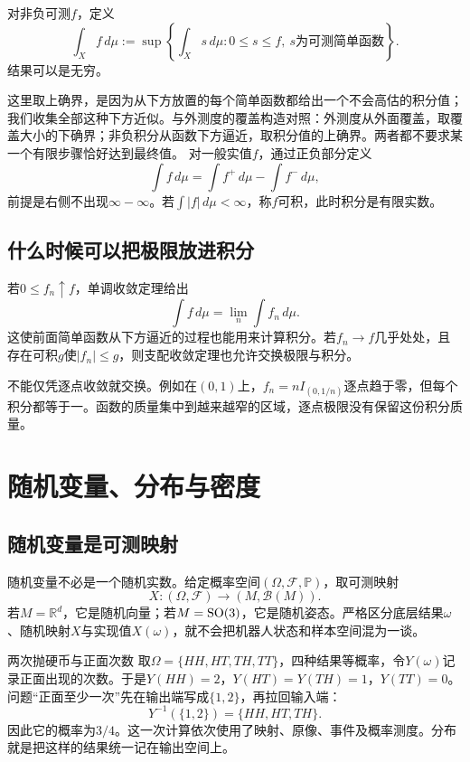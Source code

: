 对非负可测$f$，定义
\[
 \int_X f\,d\mu
 :=\sup\left\{\int_X s\,d\mu:
      0\leq s\leq f,\ s\text{为可测简单函数}\right\}.
\]
结果可以是无穷。

这里取上确界，是因为从下方放置的每个简单函数都给出一个不会高估的积分值；我们收集全部这种下方近似。与外测度的覆盖构造对照：外测度从外面覆盖，取覆盖大小的下确界；非负积分从函数下方逼近，取积分值的上确界。两者都不要求某一个有限步骤恰好达到最终值。
对一般实值$f$，通过正负部分定义
\[
 \int f\,d\mu=\int f^+\,d\mu-\int f^-\,d\mu,
\]
前提是右侧不出现$\infty-\infty$。若$\int|f|\,d\mu<\infty$，称$f$可积，此时积分是有限实数。

\subsection{什么时候可以把极限放进积分}

若$0\leq f_n\uparrow f$，单调收敛定理给出
\[
 \int f\,d\mu=\lim_n\int f_n\,d\mu.
\]
这使前面简单函数从下方逼近的过程也能用来计算积分。若$f_n\to f$几乎处处，且存在可积$g$使$|f_n|\leq g$，则支配收敛定理也允许交换极限与积分。

不能仅凭逐点收敛就交换。例如在$(0,1)$上，$f_n=nI_{(0,1/n)}$逐点趋于零，但每个积分都等于一。函数的质量集中到越来越窄的区域，逐点极限没有保留这份积分质量。

\section{随机变量、分布与密度}

\subsection{随机变量是可测映射}

随机变量不必是一个随机实数。给定概率空间$(\Omega,\mathscr F,\mathbb P)$，取可测映射
\[
 X:(\Omega,\mathscr F)\to(M,\mathcal B(M)).
\]
若$M=\mathbb R^d$，它是随机向量；若$M=\operatorname{SO}(3)$，它是随机姿态。严格区分底层结果$\omega$、随机映射$X$与实现值$X(\omega)$，就不会把机器人状态和样本空间混为一谈。

\begin{bookexample}{两次抛硬币与正面次数}
取$\Omega=\{HH,HT,TH,TT\}$，四种结果等概率，令$Y(\omega)$记录正面出现的次数。于是$Y(HH)=2$，$Y(HT)=Y(TH)=1$，$Y(TT)=0$。问题“正面至少一次”先在输出端写成$\{1,2\}$，再拉回输入端：
\[
 Y^{-1}(\{1,2\})=\{HH,HT,TH\}.
\]
因此它的概率为$3/4$。这一次计算依次使用了映射、原像、事件及概率测度。分布就是把这样的结果统一记在输出空间上。
\end{bookexample}


